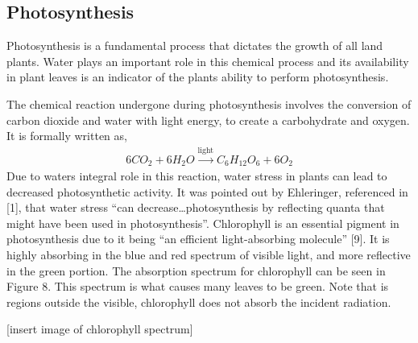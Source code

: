 \subsection{Photosynthesis}

Photosynthesis is a fundamental process that dictates the growth of all land plants.  Water plays an important role in this chemical process and its availability in plant leaves is an indicator of the plants ability to perform photosynthesis.

The chemical reaction undergone during photosynthesis involves the conversion of carbon dioxide and water with light energy, to create a carbohydrate and oxygen.  It is formally written as,
%
\begin{align}
    6CO_2 + 6H_2O \xrightarrow{\text{light}} C_6H_12O_6 + 6O_2
\end{align}
%
Due to waters integral role in this reaction, water stress in plants can lead to decreased photosynthetic activity.  It was pointed out by Ehleringer, referenced in [1], that water stress “can decrease…photosynthesis by reflecting quanta that might have been used in photosynthesis”.   Chlorophyll is an essential pigment in photosynthesis due to it being “an efficient light-absorbing molecule” [9].  It is highly absorbing in the blue and red spectrum of visible light, and more reflective in the green portion.  The absorption spectrum for chlorophyll can be seen in Figure 8. This spectrum is what causes many leaves to be green.  Note that is regions outside the visible, chlorophyll does not absorb the incident radiation.

[insert image of chlorophyll spectrum]
